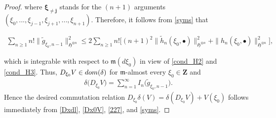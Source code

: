\documentclass[10pt,a4paper]{amsart}
\newcommand{\bul}{\bullet}
\newcommand{\dl}{\delta}
\newcommand{\dom}{\textup{dom}}
\newcommand{\fH}{\mathfrak{H}}
\newcommand{\fm}{\mathfrak{m}}
\newcommand{\noi}{\noindent}
\newcommand{\wt}{\widetilde}
\begin{document}
\begin{proof}
 
 
 
 
 
 \noi
 where 
 $\pmb{\xi_{\neq j}}$ stands for the $(n+1)$ arguments 
 $(\xi_0, ...,  \xi_{j-1},\xi_{j+1}, ...,  \xi_{n+1})$.
 Therefore, it follows from \eqref{syms} that 
 
 \noi
 \begin{align*}
 \sum_{n\geq 1} n! \| \wt  g_{\xi_0, n-1} \|^2_{\fH^{\otimes n}}
 \leq 
 2  \sum_{n\geq 1} n! 
 \Big[   (n+1)^2 \|  \wt{h}_{n}(\xi_0, \bul) \|^2_{\fH^{\otimes n}}
  + \| h_{n}(\xi_0, \bul) \|^2_{\fH^{\otimes n}} \Big]   ,
 \end{align*}
 
 \noi
 which is integrable with respect to $\fm(d\xi_0)$ in view of \eqref{cond_H2} and \eqref{cond_H3}.
 Thus, $D_{\xi_0} V\in\dom(\dl)$
 for $\fm$-almost every $\xi_0\in\mathbf{Z}$ and
 \begin{align}\label{Dx0V}
 \dl\big( D_{\xi_0}V \big) = \sum_{n=1}^\infty I_n\big( \wt  g_{\xi_0, n-1}  \big).
 \end{align}
Hence the desired commutation relation $D_{\xi_0} \dl(V) = \dl( D_{\xi_0}V) + V(\xi_0)$
follows immediately 
from \eqref{Dxdl}, \eqref{Dx0V}, \eqref{227}, and \eqref{syms}. \qedhere
 
\end{proof}
\end{document}
